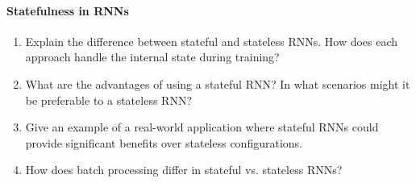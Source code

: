 \paragraph*{Statefulness in RNNs}

\begin{enumerate}
	\item Explain the difference between stateful and stateless RNNs. How does each approach handle the internal state during training?
	\item What are the advantages of using a stateful RNN? In what scenarios might it be preferable to a stateless RNN?
	\item Give an example of a real-world application where stateful RNNs could provide significant benefits over stateless configurations.
	\item How does batch processing differ in stateful vs. stateless RNNs?
\end{enumerate}
